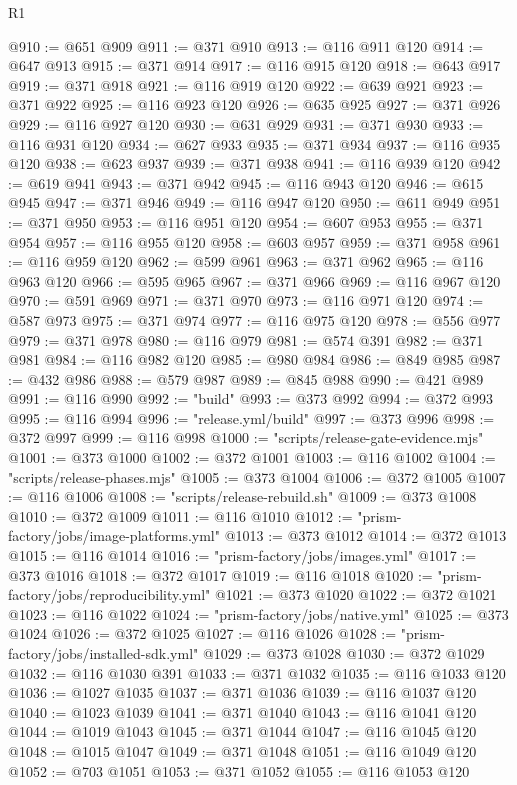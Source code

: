 \begin{lexlean}{R1}
\begin{coremodule}
@910 := @651 @909
@911 := @371 @910
@913 := @116 @911 @120
@914 := @647 @913
@915 := @371 @914
@917 := @116 @915 @120
@918 := @643 @917
@919 := @371 @918
@921 := @116 @919 @120
@922 := @639 @921
@923 := @371 @922
@925 := @116 @923 @120
@926 := @635 @925
@927 := @371 @926
@929 := @116 @927 @120
@930 := @631 @929
@931 := @371 @930
@933 := @116 @931 @120
@934 := @627 @933
@935 := @371 @934
@937 := @116 @935 @120
@938 := @623 @937
@939 := @371 @938
@941 := @116 @939 @120
@942 := @619 @941
@943 := @371 @942
@945 := @116 @943 @120
@946 := @615 @945
@947 := @371 @946
@949 := @116 @947 @120
@950 := @611 @949
@951 := @371 @950
@953 := @116 @951 @120
@954 := @607 @953
@955 := @371 @954
@957 := @116 @955 @120
@958 := @603 @957
@959 := @371 @958
@961 := @116 @959 @120
@962 := @599 @961
@963 := @371 @962
@965 := @116 @963 @120
@966 := @595 @965
@967 := @371 @966
@969 := @116 @967 @120
@970 := @591 @969
@971 := @371 @970
@973 := @116 @971 @120
@974 := @587 @973
@975 := @371 @974
@977 := @116 @975 @120
@978 := @556 @977
@979 := @371 @978
@980 := @116 @979
@981 := @574 @391
@982 := @371 @981
@984 := @116 @982 @120
@985 := @980 @984
@986 := @849 @985
@987 := @432 @986
@988 := @579 @987
@989 := @845 @988
@990 := @421 @989
@991 := @116 @990
@992 := "build"
@993 := @373 @992
@994 := @372 @993
@995 := @116 @994
@996 := "release.yml/build"
@997 := @373 @996
@998 := @372 @997
@999 := @116 @998
@1000 := "scripts/release-gate-evidence.mjs"
@1001 := @373 @1000
@1002 := @372 @1001
@1003 := @116 @1002
@1004 := "scripts/release-phases.mjs"
@1005 := @373 @1004
@1006 := @372 @1005
@1007 := @116 @1006
@1008 := "scripts/release-rebuild.sh"
@1009 := @373 @1008
@1010 := @372 @1009
@1011 := @116 @1010
@1012 := "prism-factory/jobs/image-platforms.yml"
@1013 := @373 @1012
@1014 := @372 @1013
@1015 := @116 @1014
@1016 := "prism-factory/jobs/images.yml"
@1017 := @373 @1016
@1018 := @372 @1017
@1019 := @116 @1018
@1020 := "prism-factory/jobs/reproducibility.yml"
@1021 := @373 @1020
@1022 := @372 @1021
@1023 := @116 @1022
@1024 := "prism-factory/jobs/native.yml"
@1025 := @373 @1024
@1026 := @372 @1025
@1027 := @116 @1026
@1028 := "prism-factory/jobs/installed-sdk.yml"
@1029 := @373 @1028
@1030 := @372 @1029
@1032 := @116 @1030 @391
@1033 := @371 @1032
@1035 := @116 @1033 @120
@1036 := @1027 @1035
@1037 := @371 @1036
@1039 := @116 @1037 @120
@1040 := @1023 @1039
@1041 := @371 @1040
@1043 := @116 @1041 @120
@1044 := @1019 @1043
@1045 := @371 @1044
@1047 := @116 @1045 @120
@1048 := @1015 @1047
@1049 := @371 @1048
@1051 := @116 @1049 @120
@1052 := @703 @1051
@1053 := @371 @1052
@1055 := @116 @1053 @120

\end{coremodule}
\end{lexlean}
